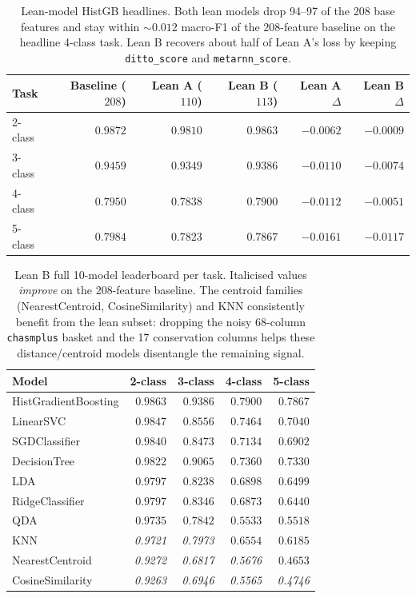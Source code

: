 \documentclass[11pt,a4paper]{article}
\begin{document}
\begin{table}[H]
\centering
\caption{Lean-model HistGB headlines. Both lean models drop 94--97 of
the 208 base features and stay within $\sim 0.012$ macro-F1 of the
$208$-feature baseline on the headline 4-class task. Lean B recovers
about half of Lean A's loss by keeping \texttt{ditto\_score} and
\texttt{metarnn\_score}.}
\label{tab:lean-headline}
\small
\begin{tabular}{lrrrrr}
\toprule
Task & Baseline ($208$) & Lean A ($110$) & Lean B ($113$) & Lean A $\Delta$ & Lean B $\Delta$ \\
\midrule
2-class & $0.9872$ & $0.9810$ & $\mathbf{0.9863}$ & $-0.0062$ & $-0.0009$ \\
3-class & $0.9459$ & $0.9349$ & $\mathbf{0.9386}$ & $-0.0110$ & $-0.0074$ \\
4-class & $0.7950$ & $0.7838$ & $\mathbf{0.7900}$ & $-0.0112$ & $-0.0051$ \\
5-class & $0.7984$ & $0.7823$ & $\mathbf{0.7867}$ & $-0.0161$ & $-0.0117$ \\
\bottomrule
\end{tabular}
\end{table}

\begin{table}[H]
\centering
\caption{Lean B full 10-model leaderboard per task. Italicised values
\emph{improve} on the $208$-feature baseline. The centroid families
(NearestCentroid, CosineSimilarity) and KNN consistently benefit from
the lean subset: dropping the noisy 68-column \texttt{chasmplus} basket
and the 17 conservation columns helps these distance/centroid models
disentangle the remaining signal.}
\label{tab:lean-full}
\small
\begin{tabular}{lrrrr}
\toprule
Model & 2-class & 3-class & 4-class & 5-class \\
\midrule
HistGradientBoosting & $\mathbf{0.9863}$ & $\mathbf{0.9386}$ & $\mathbf{0.7900}$ & $\mathbf{0.7867}$ \\
LinearSVC & $0.9847$ & $0.8556$ & $0.7464$ & $0.7040$ \\
SGDClassifier & $0.9840$ & $0.8473$ & $0.7134$ & $0.6902$ \\
DecisionTree & $0.9822$ & $0.9065$ & $0.7360$ & $0.7330$ \\
LDA & $0.9797$ & $0.8238$ & $0.6898$ & $0.6499$ \\
RidgeClassifier & $0.9797$ & $0.8346$ & $0.6873$ & $0.6440$ \\
QDA & $0.9735$ & $0.7842$ & $0.5533$ & $0.5518$ \\
KNN & \emph{0.9721} & \emph{0.7973} & $0.6554$ & $0.6185$ \\
NearestCentroid & \emph{0.9272} & \emph{0.6817} & \emph{0.5676} & $0.4653$ \\
CosineSimilarity & \emph{0.9263} & \emph{0.6946} & \emph{0.5565} & \emph{0.4746} \\
\bottomrule
\end{tabular}
\end{table}
\end{document}
